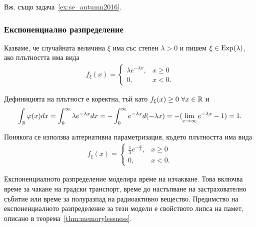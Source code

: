 \documentclass[numbers=endperiod, bibliography=totocnumbered]{scrartcl}
\begin{document}
Вж. също задача~\ref{ex:se_autumn2016}.

\subsubsection{Експоненциално разпределение}\label{dist:exp}

\begin{definition}
  Казваме, че случайната величина \( \xi \) има  със степен \( \lambda > 0 \) и пишем \( \xi \in \operatorname{Exp}(\lambda) \), ако плътността има вида
  \begin{align*}
    f_\xi(x) = \begin{cases}
      \lambda e^{-\lambda x}, & x \geq 0 \\
      0, &x < 0.
    \end{cases}
  \end{align*}

  Дефиницията на плътност е коректна, тъй като \( f_\xi(x) \geq 0~\forall x \in \mathbb{R} \) и
  \begin{align*}
    \int_{\mathbb{R}} \varphi(x) dx
    =
    \int_0^\infty \lambda e^{-\lambda x} dx
    =
    -\int_0^\infty e^{-\lambda x} d(-\lambda x)
    =
    -(\lim_{x \to \infty} e^{-\lambda x} - 1)
    =
    1.
  \end{align*}

  Понякога се използва алтернативна параметризация, където плътността има вида
  \begin{align*}
    f_\xi(x) = \begin{cases}
      \frac 1 \lambda e^{-\frac x \lambda}, & x \geq 0 \\
      0, &x < 0.
    \end{cases}
  \end{align*}
\end{definition}

Експоненциалното разпределение моделира време на изчакване. Това включва време за чакане на градски транспорт, време до настъпване на застрахователно събитие или време за полуразпад на радиоактивно вещество. Предимство на експоненциалното разпределение за тези модели е свойството липса на памет, описано в теорема~\ref{thm:memorylessness}.
\end{document}

